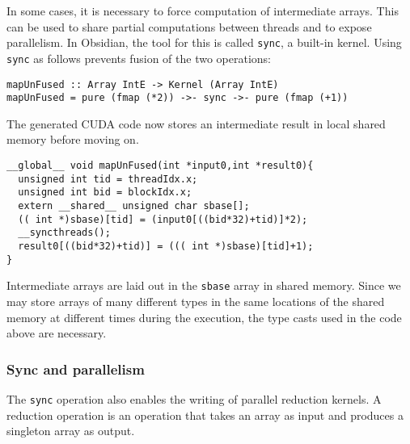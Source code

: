 In some cases, it is necessary to force computation of 
intermediate arrays. This can be used to share partial computations between 
threads and to expose parallelism. In Obsidian, the tool for this
is called {\tt sync}, a built-in kernel. Using {\tt sync} as follows prevents fusion of the
two operations:
\begin{codesize} 
\begin{verbatim}
mapUnFused :: Array IntE -> Kernel (Array IntE) 
mapUnFused = pure (fmap (*2)) ->- sync ->- pure (fmap (+1))
\end{verbatim}
\end{codesize}
The generated CUDA code now stores an intermediate result in local shared
memory before moving on. 
\begin{codesize} 
\begin{verbatim}
__global__ void mapUnFused(int *input0,int *result0){
  unsigned int tid = threadIdx.x;
  unsigned int bid = blockIdx.x;
  extern __shared__ unsigned char sbase[];
  (( int *)sbase)[tid] = (input0[((bid*32)+tid)]*2);
  __syncthreads();
  result0[((bid*32)+tid)] = ((( int *)sbase)[tid]+1);
}
\end{verbatim}
\end{codesize}
Intermediate arrays are laid out in the {\tt sbase} array in shared memory. 
Since we may store arrays of many different types in the same locations 
of the shared memory at different times during the execution, the type casts
used in the code above are necessary. 

\subsubsection{Sync and parallelism}

The {\tt sync} operation also enables the writing of parallel reduction 
kernels. A reduction operation is an operation that takes an array as input
and
produces a singleton array as output. 

